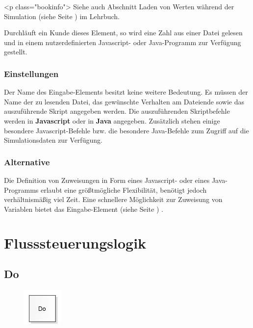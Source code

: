 <p class="bookinfo">
Siehe auch Abschnitt Laden von Werten während der Simulation (siehe Seite \pageref{ref:book:9.3.2}) im Lehrbuch.

Durchläuft ein Kunde dieses Element, so wird eine Zahl aus einer Datei gelesen und in
einem nutzerdefinierten Javascript- oder Java-Programm zur Verfügung gestellt. 

\subsection*{Einstellungen}

Der Name des Eingabe-Elements besitzt keine weitere Bedeutung. Es müssen der Name der zu lesenden
Datei, das gewünschte Verhalten am Dateiende sowie das auszuführende Skript angegeben werden.
Die auszuführenden Skriptbefehle werden in \textbf{Javascript} oder in \textbf{Java} angegeben.
Zusätzlich stehen einige besondere Javascript-Befehle bzw.
die besondere Java-Befehle 
zum Zugriff auf die Simulationsdaten zur Verfügung.

\subsection*{Alternative}

Die Definition von Zuweisungen in Form eines Javascript- oder eines Java-Programms erlaubt eine größtmögliche Flexibilität,
benötigt jedoch verhältnismäßig viel Zeit. Eine schnellere Möglichkeit zur Zuweisung von Variablen
bietet das Eingabe-Element (siehe Seite \pageref{ref:ModelElementInput}) .





\chapter{Flusssteuerungslogik}

\section{Do}
\label{ref:ModelElementLogicDo}

\begin{figure}
\vspace{-22pt}
\includegraphics[width=2cm]{imageModelElementLogicDo.png}
\vspace{-22pt}
\end{figure}

